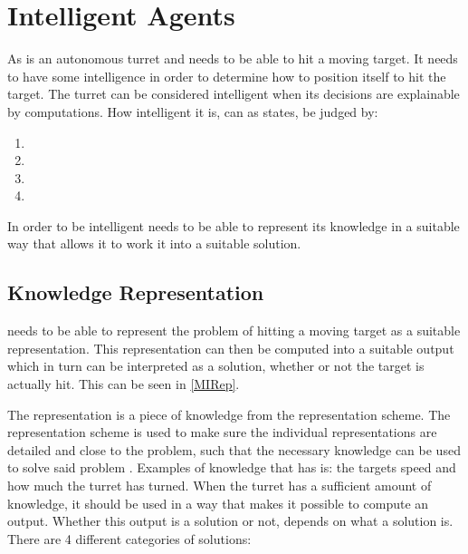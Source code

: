 \section{Intelligent Agents}
 
As \name is an autonomous turret and needs to be able to hit a moving target.
It needs to have some intelligence in order to determine how to position itself
to hit the target. The turret can be considered intelligent when its decisions
are explainable by computations. How intelligent it is, can as
\citep[ch.1.1,p.4]{MIBook} states, be judged by:

\begin{enumerate}
  
  \item {}
  \item {}
  \item {}
  \item {}
\end{enumerate}

In order to be intelligent \name needs to be able to represent its
knowledge in a suitable way that allows it to work it into a suitable solution. 

\subsection{Knowledge Representation}\label{KR}

\name needs to be able to represent the problem of hitting a
moving target as a suitable representation. This representation can then be
computed into a suitable output which in turn can be interpreted as
a solution, whether or not the target is actually hit. This can be seen in
\autoref{MIRep}.


The representation is a piece of knowledge from the representation
scheme. The representation scheme is used to make sure the individual
representations are detailed and close to the problem, such that the necessary
knowledge can be used to solve said problem \citep[ch.1.4.1]{MIBook}.
Examples of knowledge that \name has is: the targets speed and how much the turret has
turned. When the turret has a sufficient amount of knowledge, it should be used
in a way that makes it possible to compute an output. Whether this output is a
solution or not, depends on what a solution is. There are 4 different categories
of solutions:

